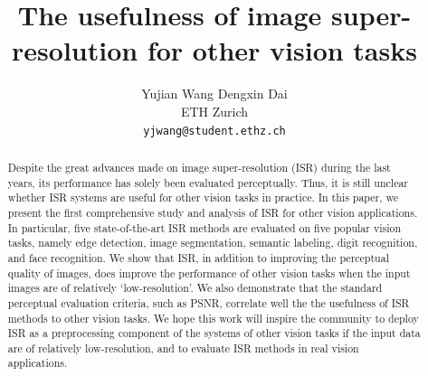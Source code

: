 \documentclass[10pt,twocolumn,letterpaper]{article}
\begin{document}
\title{The usefulness of image super-resolution for other vision tasks}

\author{Yujian Wang \hspace{2cm} Dengxin Dai \\
ETH Zurich\\
{\tt\small yjwang@student.ethz.ch}
}

\maketitle
\ifwacvfinal\thispagestyle{empty}\fi

\begin{abstract}
Despite the great advances made on image super-resolution (ISR)
  during the last years, its performance has solely been evaluated
  perceptually. Thus, it is still unclear whether ISR systems are
  useful for other vision tasks in practice. In this paper, we present
  the first comprehensive study and analysis of ISR for other vision
  applications. In particular, five state-of-the-art ISR methods are
  evaluated on five popular vision tasks, namely edge detection, image
  segmentation, semantic labeling, digit recognition, and face
  recognition. We show that ISR, in addition to improving the
  perceptual quality of images, does improve the performance of other
  vision tasks when the input images are of relatively
  `low-resolution'. We also demonstrate that the standard perceptual
  evaluation criteria, such as PSNR, correlate well the the usefulness
  of ISR methods to other vision tasks. We hope this work will inspire
  the community to deploy ISR as a preprocessing component of the
  systems of other vision tasks if the input data are of relatively
  low-resolution, and to evaluate ISR methods in real vision
  applications.
\end{abstract}


\end{document}
